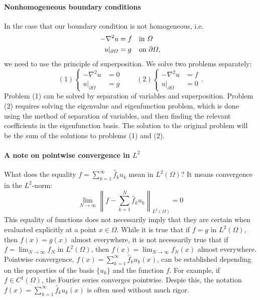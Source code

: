 \paragraph{Nonhomogeneous boundary conditions} In the case that our boundary condition is not homogeneous, i.e. 
\begin{equation}
    \begin{aligned}
        -\nabla^2 u&=f&&\text{in }\Omega\\ 
        u|_{\partial\Omega}&=g&&\text{on }\partial\Omega,
    \end{aligned}
\end{equation}
we need to use the principle of superposition. We solve two problems separately: 
\begin{equation*}
    (1)\begin{cases}-\nabla^{2}u&=0\\ u|_{\partial\Omega}&=g\end{cases}\qquad (2)\begin{cases}-\nabla^{2}u&=f\\ u|_{\partial\Omega}&=0\end{cases}.
\end{equation*}
Problem (1) can be solved by separation of variables and superposition. Problem (2) requires solving the eigenvalue and eigenfunction problem, which is done using the method of separation of variables, and then finding the relevant coefficients in the eigenfunction basis. The solution to the original problem will be the sum of the solutions to problems (1) and (2).

\paragraph{A note on pointwise convergence in $L^2$} What does the equality $f=\sum_{k=1}^{\infty}\hat{f}_{k}u_{k}$ mean in $L^{2}(\Omega)$?  It means convergence in the $L^2$-norm:
\begin{equation*}
    \lim_{N\rightarrow\infty}\left\|f-\sum_{k=1}^{N}\hat{f}_{k}u_{k}\right\|_{L^{2}(\Omega)}=0
\end{equation*}
This equality of functions does not necessarily imply that they are certain when evaluated explicitly at a point $x\in\Omega$. While it is true that if $f=g$ in $L^{2}(\Omega)$, then $f(x)=g(x)$ almost everywhere, it is not necessarily true that if $f=\lim_{N\rightarrow\infty}f_{N}$ in $L^{2}(\Omega)$, then $f(x)=\lim_{N\rightarrow\infty}f_{N}(x)$ almost everywhere. Pointwise convergence, $f(x)=\sum_{k=1}^{\infty}\hat{f}_{k}u_{k}(x)$, can be established depending on the properties of the basis $\{u_k\}$ and the function $f$. For example, if $f\in C^{1}(\Omega)$, the Fourier series converges pointwise. Despie this, the notation $f(x)=\sum_{k=1}^{\infty}\hat{f}_{k}u_{k}(x)$ is often used without much rigor.

